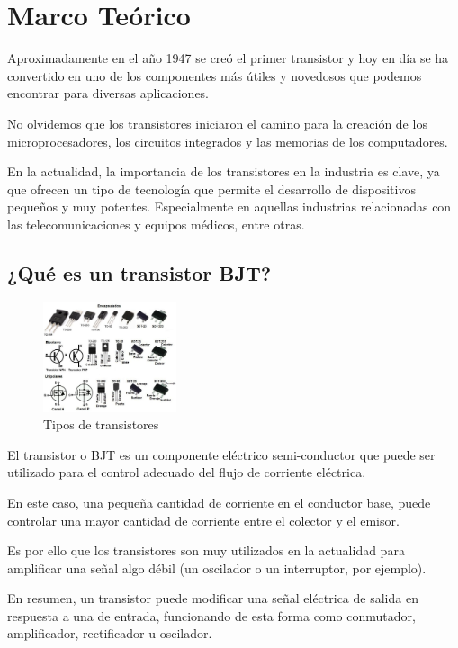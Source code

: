 \section{Marco Teórico}
Aproximadamente en el año 1947 se creó el primer transistor y hoy en día se ha convertido en uno de los componentes más útiles y novedosos que podemos encontrar para diversas aplicaciones.

No olvidemos que los transistores iniciaron el camino para la creación de los microprocesadores, los circuitos integrados y las memorias de los computadores.

En la actualidad, la importancia de los transistores en la industria es clave, ya que ofrecen un tipo de tecnología que permite el desarrollo de dispositivos pequeños y muy potentes. Especialmente en aquellas industrias relacionadas con las telecomunicaciones y equipos médicos, entre otras.

\subsection{¿Qué es un transistor BJT?}

\begin{figure}
    \centering
    \includegraphics[width=0.35\textwidth]{Imagenes/transistores.jpg}
    \caption{Tipos de transistores}
    \label{fig:transistores}
\end{figure}

El transistor o BJT es un componente eléctrico semi-conductor que puede ser utilizado para el control adecuado del flujo de corriente eléctrica.


En este caso, una pequeña cantidad de corriente en el conductor base, puede controlar una mayor cantidad de corriente entre el colector y el emisor.

Es por ello que los transistores son muy utilizados en la actualidad para amplificar una señal algo débil (un oscilador o un interruptor, por ejemplo).

En resumen, un transistor puede modificar una señal eléctrica de salida en respuesta a una de entrada, funcionando de esta forma como conmutador, amplificador, rectificador u oscilador.

